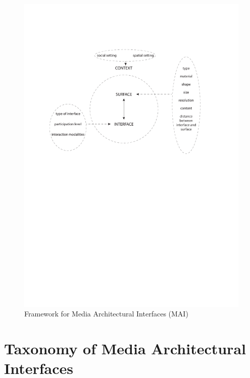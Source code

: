 \begin{figure}[htp]
\centering
\includegraphics[width=\textwidth]{Illustrations/MAI_Framework.pdf}
\caption{Framework for Media Architectural Interfaces (MAI)}
\label{fig:MAI_Framework}
\end{figure}

\section{Taxonomy of Media Architectural Interfaces}

